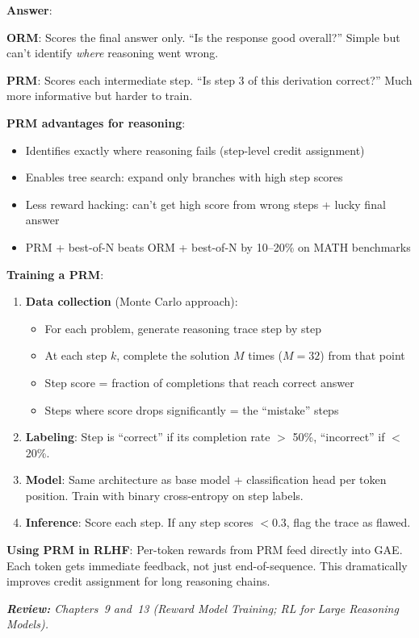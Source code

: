 \begin{questionbox}
\textbf{Answer}:

\textbf{ORM}: Scores the final answer only. ``Is the response good overall?'' Simple but can’t identify \emph{where} reasoning went wrong.

\textbf{PRM}: Scores each intermediate step. ``Is step 3 of this derivation correct?'' Much more informative but harder to train.

\textbf{PRM advantages for reasoning}:

\begin{itemize}
  \item Identifies exactly where reasoning fails (step-level credit assignment)
  \item Enables tree search: expand only branches with high step scores
  \item Less reward hacking: can’t get high score from wrong steps + lucky final answer
  \item PRM + best-of-N beats ORM + best-of-N by 10--20\% on MATH benchmarks
\end{itemize}

\textbf{Training a PRM}:

\begin{enumerate}
  \item \textbf{Data collection} (Monte Carlo approach):

\begin{itemize}
  \item For each problem, generate reasoning trace step by step
  \item At each step $k$, complete the solution $M$ times ($M=32$) from that point
  \item Step score = fraction of completions that reach correct answer
  \item Steps where score drops significantly = the ``mistake'' steps
\end{itemize}
  \item \textbf{Labeling}: Step is ``correct'' if its completion rate $>$ 50\%, ``incorrect'' if $<$ 20\%.
  \item \textbf{Model}: Same architecture as base model + classification head per token position. Train with binary cross-entropy on step labels.
  \item \textbf{Inference}: Score each step. If any step scores $<$0.3, flag the trace as flawed.
\end{enumerate}

\textbf{Using PRM in RLHF}: Per-token rewards from PRM feed directly into GAE. Each token gets immediate feedback, not just end-of-sequence. This dramatically improves credit assignment for long reasoning chains.

\emph{\textbf{Review:} Chapters~9 and~13 (Reward Model Training; RL for Large Reasoning Models).}
\end{questionbox}

